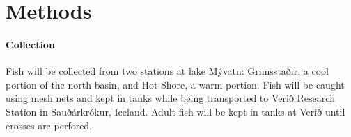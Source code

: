 \documentclass[12pt]{extarticle}
\begin{document}



\section*{Methods}

\paragraph{Collection}
Fish will be collected from two stations at lake M\'yvatn: Grimsstaðir, a cool portion of the north basin, and Hot Shore, a warm portion. Fish will be caught using mesh nets and kept in tanks while being transported to Verið Research Station in Sauðárkrókur, Iceland. Adult fish will be kept in tanks at Verið until crosses are perfored.
\end{document}
